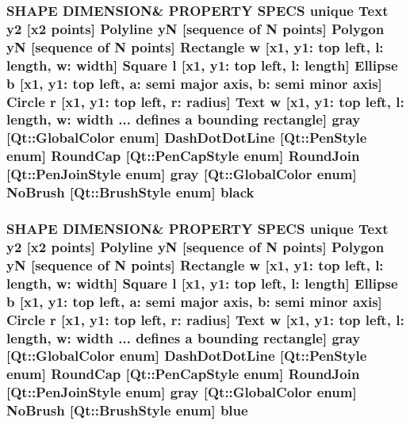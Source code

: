 \subsubsection[{\texorpdfstring{black}{black}}]{\setlength{\rightskip}{0pt plus 5cm}S\+H\+A\+PE D\+I\+M\+E\+N\+S\+I\+ON\& P\+R\+O\+P\+E\+R\+TY S\+P\+E\+CS unique {\bf Text} {\bf y2} \mbox{[}{\bf x2} points\mbox{]} {\bf Polyline} yN \mbox{[}sequence of N points\mbox{]} {\bf Polygon} yN \mbox{[}sequence of N points\mbox{]} {\bf Rectangle} w \mbox{[}{\bf x1}, y1\+: top left, l\+: length, w\+: width\mbox{]} {\bf Square} {\bf l} \mbox{[}{\bf x1}, y1\+: top left, l\+: length\mbox{]} {\bf Ellipse} b \mbox{[}{\bf x1}, y1\+: top left, a\+: semi major axis, b\+: semi minor axis\mbox{]} {\bf Circle} r \mbox{[}{\bf x1}, y1\+: top left, r\+: radius\mbox{]} {\bf Text} w \mbox{[}{\bf x1}, y1\+: top left, l\+: length, w\+: width ... defines {\bf a} bounding rectangle\mbox{]} gray \mbox{[}Qt\+::\+Global\+Color enum\mbox{]} Dash\+Dot\+Dot\+Line \mbox{[}Qt\+::\+Pen\+Style enum\mbox{]} Round\+Cap \mbox{[}{\bf Qt\+::\+Pen\+Cap\+Style} enum\mbox{]} Round\+Join \mbox{[}{\bf Qt\+::\+Pen\+Join\+Style} enum\mbox{]} gray \mbox{[}Qt\+::\+Global\+Color enum\mbox{]} No\+Brush \mbox{[}{\bf Qt\+::\+Brush\+Style} enum\mbox{]} black}\hypertarget{shape__input__file__specs_8txt_a54a8afc7fef4e6a72193d1b76188b473}{}\label{shape__input__file__specs_8txt_a54a8afc7fef4e6a72193d1b76188b473}
\subsubsection[{\texorpdfstring{blue}{blue}}]{\setlength{\rightskip}{0pt plus 5cm}S\+H\+A\+PE D\+I\+M\+E\+N\+S\+I\+ON\& P\+R\+O\+P\+E\+R\+TY S\+P\+E\+CS unique {\bf Text} {\bf y2} \mbox{[}{\bf x2} points\mbox{]} {\bf Polyline} yN \mbox{[}sequence of N points\mbox{]} {\bf Polygon} yN \mbox{[}sequence of N points\mbox{]} {\bf Rectangle} w \mbox{[}{\bf x1}, y1\+: top left, l\+: length, w\+: width\mbox{]} {\bf Square} {\bf l} \mbox{[}{\bf x1}, y1\+: top left, l\+: length\mbox{]} {\bf Ellipse} b \mbox{[}{\bf x1}, y1\+: top left, a\+: semi major axis, b\+: semi minor axis\mbox{]} {\bf Circle} r \mbox{[}{\bf x1}, y1\+: top left, r\+: radius\mbox{]} {\bf Text} w \mbox{[}{\bf x1}, y1\+: top left, l\+: length, w\+: width ... defines {\bf a} bounding rectangle\mbox{]} gray \mbox{[}Qt\+::\+Global\+Color enum\mbox{]} Dash\+Dot\+Dot\+Line \mbox{[}Qt\+::\+Pen\+Style enum\mbox{]} Round\+Cap \mbox{[}{\bf Qt\+::\+Pen\+Cap\+Style} enum\mbox{]} Round\+Join \mbox{[}{\bf Qt\+::\+Pen\+Join\+Style} enum\mbox{]} gray \mbox{[}Qt\+::\+Global\+Color enum\mbox{]} No\+Brush \mbox{[}{\bf Qt\+::\+Brush\+Style} enum\mbox{]} blue}\hypertarget{shape__input__file__specs_8txt_a502b3afd7545a4195802c325ab686a9f}{}\label{shape__input__file__specs_8txt_a502b3afd7545a4195802c325ab686a9f}
